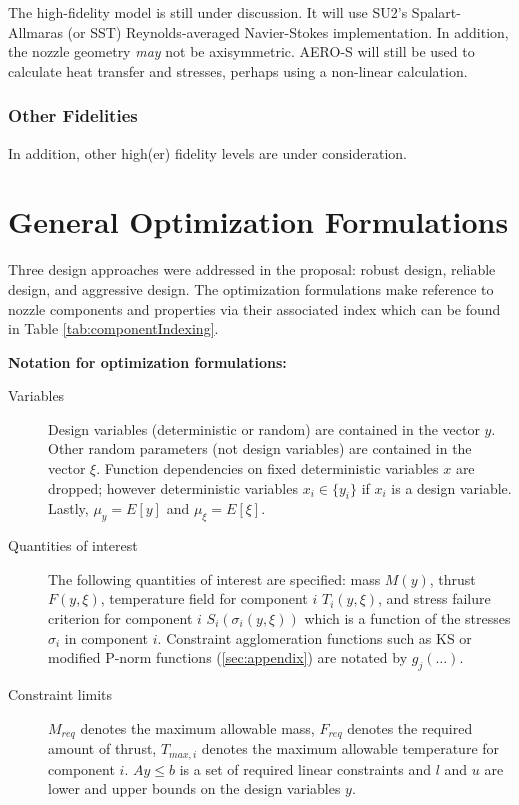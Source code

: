 \documentclass{article}
\begin{document}
The high-fidelity model is still under discussion. It will use SU2's Spalart-Allmaras (or SST) Reynolds-averaged Navier-Stokes implementation. In addition, the nozzle geometry \textit{may} not be axisymmetric. AERO-S will still be used to calculate heat transfer and stresses, perhaps using a non-linear calculation.

\subsubsection{Other Fidelities}

In addition, other high(er) fidelity levels are under consideration.

\section{General Optimization Formulations} \label{sec:generalOptimizationFormulations}

Three design approaches were addressed in the proposal: robust design, reliable design, and aggressive design. The optimization formulations make reference to nozzle components and properties via their associated index which can be found in Table \ref{tab:componentIndexing}. 

\begin{mdframed}
\textbf{Notation for optimization formulations:}  
\begin{description}
\item[Variables] Design variables (deterministic or random) are contained in the vector $y$. Other random parameters (not design variables) are contained in the vector $\xi$. Function dependencies on fixed deterministic variables $x$ are dropped; however deterministic variables $x_i \in \{y_i\}$ if $x_i$ is a design variable. Lastly, $\mu_y = E[y]$ and $\mu_{\xi} = E[\xi]$.

\item[Quantities of interest] The following quantities of interest are specified: mass $M(y)$, thrust $F(y,\xi)$, temperature field for component $i$ $T_i(y,\xi)$, and stress failure criterion for component $i$ $S_i (\sigma_i(y,\xi) )$ which is a function of the stresses $\sigma_i$ in component $i$. Constraint agglomeration functions such as KS or modified P-norm functions (\ref{sec:appendix}) are notated by $g_j(\ldots)$. 

\item[Constraint limits] $M_{req}$ denotes the maximum allowable mass, $F_{req}$ denotes the required amount of thrust, $T_{max,i}$ denotes the maximum allowable temperature for component $i$. $Ay \leq b$ is a set of required linear constraints and $l$ and $u$ are lower and upper bounds on the design variables $y$.
\end{description}
\end{mdframed}
\end{document}
